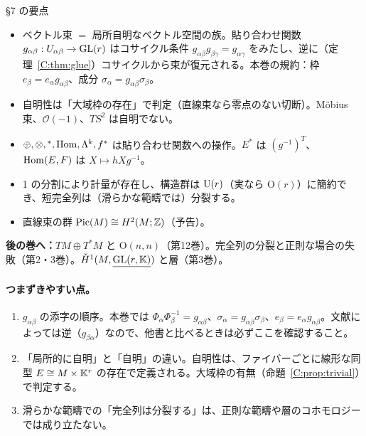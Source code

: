 \begin{keybox}{§7 の要点}
\begin{itemize}
\item ベクトル束 $=$ 局所自明なベクトル空間の族。貼り合わせ関数 $g_{\alpha\beta}:U_{\alpha\beta}\to\mathrm{GL}(r)$ はコサイクル条件 $g_{\alpha\beta}g_{\beta\gamma}=g_{\alpha\gamma}$ をみたし、逆に（定理~\ref{C:thm:glue}）コサイクルから束が復元される。本巻の規約：枠 $e_\beta=e_\alpha g_{\alpha\beta}$、成分 $\sigma_\alpha=g_{\alpha\beta}\sigma_\beta$。
\item 自明性は「大域枠の存在」で判定（直線束なら零点のない切断）。Möbius 束、$\mathcal O(-1)$、$TS^2$ は自明でない。
\item $\oplus,\otimes,{}^*,\mathrm{Hom},\Lambda^k,f^*$ は貼り合わせ関数への操作。$E^*$ は $(g^{-1})^T$、$\mathrm{Hom}(E,F)$ は $X\mapsto hXg^{-1}$。
\item 1 の分割により計量が存在し、構造群は $\mathrm{U}(r)$（実なら $\mathrm O(r)$）に簡約でき、短完全列は（滑らかな範疇では）分裂する。
\item 直線束の群 $\mathrm{Pic}(M)\cong H^2(M;\mathbb Z)$（予告）。
\end{itemize}
\textbf{後の巻へ：}$TM\oplus T^*M$ と $\mathrm O(n,n)$（第12巻）。完全列の分裂と正則な場合の失敗（第2・3巻）。$\check H^1(M,\underline{\mathrm{GL}(r,\mathbb K)})$ と層（第3巻）。
\end{keybox}

\paragraph{つまずきやすい点。}
\begin{enumerate}
\item $g_{\alpha\beta}$ の添字の順序。本巻では $\Phi_\alpha\Phi_\beta^{-1}=g_{\alpha\beta}$、$\sigma_\alpha=g_{\alpha\beta}\sigma_\beta$、$e_\beta=e_\alpha g_{\alpha\beta}$。文献によっては逆（$g_{\beta\alpha}$）なので、他書と比べるときは必ずここを確認すること。
\item 「局所的に自明」と「自明」の違い。自明性は、ファイバーごとに線形な同型 $E\cong M\times\mathbb K^r$ の存在で定義される。大域枠の有無（命題~\ref{C:prop:trivial}）で判定する。
\item 滑らかな範疇での「完全列は分裂する」は、正則な範疇や層のコホモロジーでは成り立たない。
\end{enumerate}

